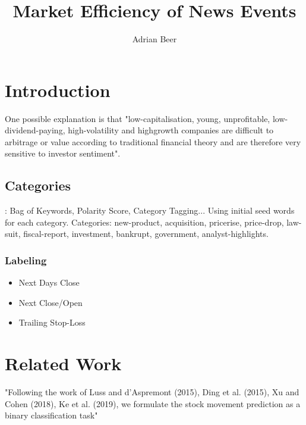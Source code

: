 \documentclass[12pt,a4paper]{article}
\title{Market Efficiency of News Events}
\author{Adrian Beer}
\date{\vspace{-10ex}}
\begin{document}
	\maketitle
	\tableofcontents 
	\section{Introduction}	
	
	One possible explanation is that "low-capitalisation, young, unprofitable, low-dividend-paying, high-volatility and highgrowth companies are difficult to arbitrage or value according to traditional financial theory and are therefore very sensitive to investor sentiment".
	
	
	\subsection{Categories}
	\cite{peng_leverage_2015}:
	Bag of Keywords, Polarity Score, Category Tagging...
	Using initial seed words for each category.
	Categories: new-product, acquisition, pricerise, price-drop, law-suit, fiscal-report, investment,
	bankrupt, government, analyst-highlights.
	
	\subsubsection{Labeling}
	\begin{itemize}
		\item{Next Days Close}
		\item{Next Close/Open}
		\item{Trailing Stop-Loss}
	\end{itemize}
	
	\section{Related Work}
	"Following the work of Luss and d’Aspremont (2015), Ding et al. (2015), Xu and Cohen (2018), Ke et al. (2019), we formulate the stock movement prediction as a binary classification task"
	
\end{document}
